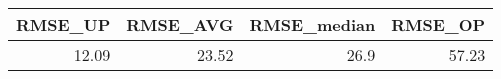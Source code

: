 \begin{tabular}{rrrr}
\toprule
 RMSE\_UP &  RMSE\_AVG &  RMSE\_median &  RMSE\_OP \\
\midrule
   12.09 &     23.52 &         26.9 &    57.23 \\
\bottomrule
\end{tabular}
